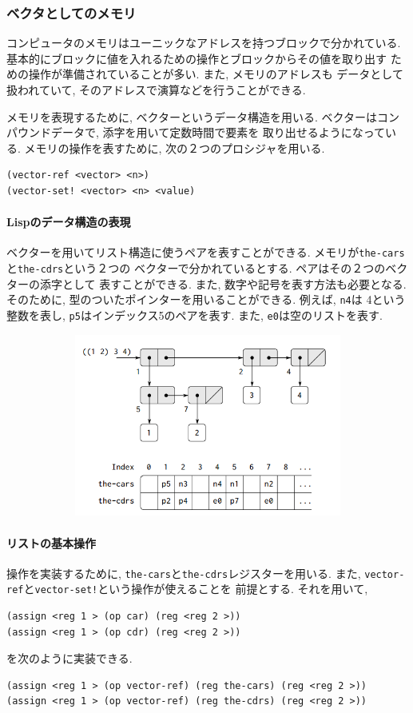 \subsubsection{ベクタとしてのメモリ}
コンピュータのメモリはユーニックなアドレスを持つブロックで分かれている.
基本的にブロックに値を入れるための操作とブロックからその値を取り出す%
ための操作が準備されていることが多い. また, メモリのアドレスも
データとして扱われていて, そのアドレスで演算などを行うことができる.

メモリを表現するために, ベクターというデータ構造を用いる.
ベクターはコンパウンドデータで, 添字を用いて定数時間で要素を%
取り出せるようになっている. メモリの操作を表すために,
次の２つのプロシジャを用いる.

\begin{lstlisting}[basicstyle=\footnotesize]
(vector-ref <vector> <n>)
(vector-set! <vector> <n> <value)
\end{lstlisting}
\paragraph{Lispのデータ構造の表現}
ベクターを用いてリスト構造に使うペアを表すことができる.
メモリが\lstinline{the-cars}と\lstinline{the-cdrs}という２つの%
ベクターで分かれているとする. ペアはその２つのベクターの添字として%
表すことができる. また, 数字や記号を表す方法も必要となる. そのために,
型のついたポインターを用いることができる. 例えば, \lstinline{n4}は
4という整数を表し, \lstinline{p5}はインデックス5のペアを表す. また,
\lstinline{e0}は空のリストを表す.
%
\begin{figure}[h]
  \centering
  \includegraphics[height=6cm,width=12cm]{imgs/box-and-pointer.png}
\end{figure}
%
\paragraph{リストの基本操作}
操作を実装するために, \lstinline{the-cars}と\lstinline{the-cdrs}レジスターを用いる.
また, \lstinline{vector-ref}と\lstinline{vector-set!}という操作が使えることを%
前提とする. それを用いて,
%
\begin{lstlisting}[basicstyle=\footnotesize]
(assign <reg 1 > (op car) (reg <reg 2 >))
(assign <reg 1 > (op cdr) (reg <reg 2 >))
\end{lstlisting}
%
を次のように実装できる.
%
\begin{lstlisting}[basicstyle=\footnotesize]
(assign <reg 1 > (op vector-ref) (reg the-cars) (reg <reg 2 >))
(assign <reg 1 > (op vector-ref) (reg the-cdrs) (reg <reg 2 >))
\end{lstlisting}

